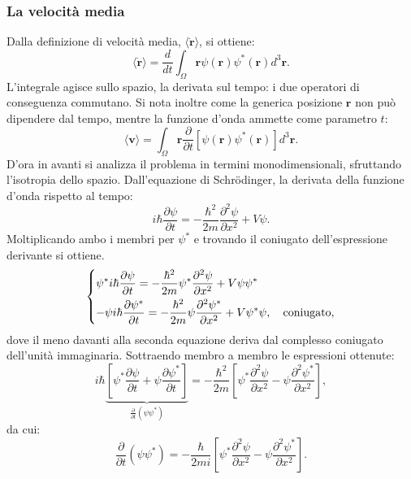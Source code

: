 \documentclass[a4paper,11pt]{report}
\begin{document}
\subsubsection{La velocità media}
Dalla definizione di velocità media, $\langle \dot{\bm{r}} \rangle$, si ottiene:
\begin{equation}
    \langle \dot{\bm{r}} \rangle =\frac{d}{dt} \int_\Omega \bm{r} \psi(\bm{r})\psi^*(\bm{r}) d^3\bm{r}.
\end{equation}
L'integrale agisce sullo spazio, la derivata sul tempo: i due operatori di conseguenza commutano. Si nota inoltre come la generica posizione $\bm{r}$ non può dipendere dal tempo, mentre la funzione d'onda ammette come parametro $t$:
\begin{equation}
    \langle {\bm{v}} \rangle = \int_\Omega \bm{r} \frac{\partial}{\partial t}[\psi(\bm{r})\psi^*(\bm{r})] d^3\bm{r}.
    \label{eq_v_HD}
\end{equation}
D'ora in avanti si analizza il problema in termini monodimensionali, sfruttando l'isotropia dello spazio. Dall'equazione di Schrödinger, la derivata della funzione d'onda rispetto al tempo:
\begin{equation}
    i\hbar \frac{\partial\psi}{\partial t} = -\frac{\hbar^2}{2m}\frac{\partial^2\psi}{\partial x^2} + V\psi.
\end{equation}
Moltiplicando ambo i membri per $\psi^*$ e trovando il coniugato dell'espressione derivante si ottiene.
\begin{equation}
\begin{dcases}
    \psi^*i\hbar \frac{\partial\psi}{\partial t} = -\frac{\hbar^2}{2m}\psi^*\frac{\partial^2\psi}{\partial x^2} + V\psi\psi^* \\
    -\psi i\hbar \frac{\partial\psi^*}{\partial t} = -\frac{\hbar^2}{2m}\psi\frac{\partial^2\psi^*}{\partial x^2} + V\psi^*\psi, \quad \text{coniugato},
    \end{dcases}
\end{equation}
dove il meno davanti alla seconda equazione deriva dal complesso coniugato dell'unità immaginaria. Sottraendo membro a membro le espressioni ottenute:
\begin{equation}
i\hbar\underbrace{\left[ \psi^* \frac{\partial\psi}{\partial t} + \psi \frac{\partial\psi^*}{\partial t}\right ]}_{\frac{\partial}{\partial t}(\psi\psi^*)} = -\frac{\hbar^2}{2m}\left[ \psi^*\frac{\partial^2\psi}{\partial x^2}- \psi\frac{\partial^2\psi^*}{\partial x^2} \right],
\end{equation}
da cui:
\begin{equation}
\frac{\partial}{\partial t}(\psi\psi^*) = -\frac{\hbar}{2mi}\left[ \psi^*\frac{\partial^2\psi}{\partial x^2}- \psi\frac{\partial^2\psi^*}{\partial x^2} \right].
\end{equation}
\end{document}
